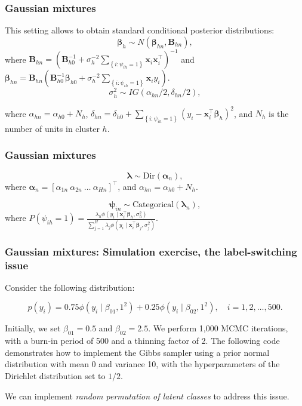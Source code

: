 \documentclass[12pt, compress]{beamer}
\begin{document}
\begin{frame}
	\frametitle{Gaussian mixtures}
This setting allows to obtain standard conditional posterior distributions: $$\boldsymbol{\beta}_{h}\sim N(\boldsymbol{\beta}_{hn},\boldsymbol{B}_{hn}),$$ where $\boldsymbol{B}_{hn}=(\boldsymbol{B}_{h0}^{-1}+\sigma_h^{-2}\sum_{\left\{i:  \psi_{ih}=1\right\}}\boldsymbol{x}_i\boldsymbol{x}_i^{\top})^{-1}$ and $\boldsymbol{\beta}_{hn}=\boldsymbol{B}_{hn}(\boldsymbol{B}_{h0}^{-1}\boldsymbol{\beta}_{h0}+\sigma_h^{-2}\sum_{\left\{i:  \psi_{ih}=1\right\}}\boldsymbol{x}_iy_i)$.
$$\sigma_h^2\sim IG(\alpha_{hn}/2,\delta_{hn}/2),$$

where $\alpha_{hn}=\alpha_{h0}+N_h$, $\delta_{hn}=\delta_{h0}+\sum_{\left\{i:  \psi_{ih}=1\right\}}(y_i-\boldsymbol{x}_i^{\top}\boldsymbol{\beta}_h)^2$, and $N_h$ is the number of units in cluster $h$.
\end{frame}

\begin{frame}
	\frametitle{Gaussian mixtures}
$$\boldsymbol{\lambda}\sim \text{Dir}(\boldsymbol{\alpha}_n),$$   
where $\boldsymbol{\alpha}_n=[\alpha_{1n} \  \alpha_{2n} \ \dots \ \alpha_{Hn}]^{\top}$, and $\alpha_{hn}=\alpha_{h0}+N_h$.

$$\boldsymbol{\psi}_{in}\sim \text{Categorical}(\boldsymbol{\lambda}_n),$$
where $P(\psi_{ih}=1)=\frac{\lambda_{h}\phi(y_i \mid \boldsymbol{x}_i^{\top}\boldsymbol{\beta}_h,\sigma_h^2)}{\sum_{j=1}^H\lambda_{j}\phi(y_i \mid \boldsymbol{x}_i^{\top}\boldsymbol{\beta}_j,\sigma_j^2)}$.

\end{frame}

\begin{frame}
	\frametitle{Gaussian mixtures: Simulation exercise, the label-switching issue}
Consider the following distribution:  

$$p(y_i) = 0.75 \phi(y_i \mid \beta_{01},1^2) + 0.25 \phi(y_i \mid \beta_{02},1^2), \quad i = 1,2,\dots,500.$$

Initially, we set $\beta_{01} = 0.5$ and $\beta_{02} = 2.5$. We perform 1,000 MCMC iterations, with a burn-in period of 500 and a thinning factor of 2. The following code demonstrates how to implement the Gibbs sampler using a prior normal distribution with mean 0 and variance 10, with the hyperparameters of the Dirichlet distribution set to $1/2$.

We can implement \textit{random permutation of latent classes} to address this issue.
\end{frame}
\end{document}

